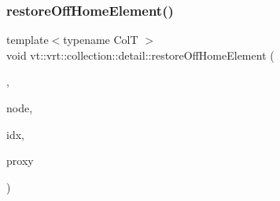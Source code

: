 \subsubsection{\texorpdfstring{restore\+Off\+Home\+Element()}{restoreOffHomeElement()}}
{\footnotesize\ttfamily template$<$typename ColT $>$ \\
void vt\+::vrt\+::collection\+::detail\+::restore\+Off\+Home\+Element (\begin{DoxyParamCaption}\item[{ColT $\ast$}]{,  }\item[{\hyperlink{namespacevt_a866da9d0efc19c0a1ce79e9e492f47e2}{Node\+Type}}]{node,  }\item[{typename Col\+T\+::\+Index\+Type}]{idx,  }\item[{\hyperlink{structvt_1_1vrt_1_1collection_1_1_collection_proxy}{Collection\+Proxy}$<$ ColT $>$}]{proxy }\end{DoxyParamCaption})\hspace{0.3cm}{\ttfamily [inline]}}

